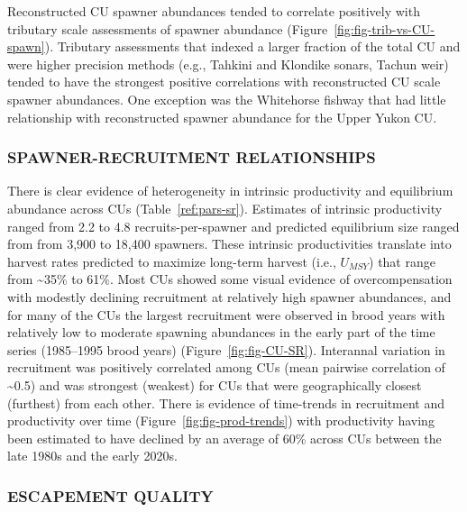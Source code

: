 \documentclass[11pt]{book}
\begin{document}
Reconstructed CU spawner abundances tended to correlate positively with tributary scale assessments of spawner abundance (Figure~\ref{fig:fig-trib-vs-CU-spawn}). Tributary assessments that indexed a larger fraction of the total CU and were higher precision methods (e.g., Tahkini and Klondike sonars, Tachun weir) tended to have the strongest positive correlations with reconstructed CU scale spawner abundances. One exception was the Whitehorse fishway that had little relationship with reconstructed spawner abundance for the Upper Yukon CU.

\hypertarget{spawner-recruitment-relationships}{%
\subsubsection{SPAWNER-RECRUITMENT RELATIONSHIPS}\label{spawner-recruitment-relationships}}

There is clear evidence of heterogeneity in intrinsic productivity and equilibrium abundance across CUs (Table~\ref{ref:pars-sr}). Estimates of intrinsic productivity ranged from 2.2 to 4.8 recruits-per-spawner and predicted equilibrium size ranged from from 3,900 to 18,400 spawners. These intrinsic productivities translate into harvest rates predicted to maximize long-term harvest (i.e., \(U_{MSY}\)) that range from \textasciitilde35\% to 61\%. Most CUs showed some visual evidence of overcompensation with modestly declining recruitment at relatively high spawner abundances, and for many of the CUs the largest recruitment were observed in brood years with relatively low to moderate spawning abundances in the early part of the time series (1985--1995 brood years) (Figure~\ref{fig:fig-CU-SR}). Interannal variation in recruitment was positively correlated among CUs (mean pairwise correlation of \textasciitilde0.5) and was strongest (weakest) for CUs that were geographically closest (furthest) from each other. There is evidence of time-trends in recruitment and productivity over time (Figure~\ref{fig:fig-prod-trends}) with productivity having been estimated to have declined by an average of 60\% across CUs between the late 1980s and the early 2020s.

\hypertarget{escapement-quality}{%
\subsubsection{ESCAPEMENT QUALITY}\label{escapement-quality}}
\end{document}
